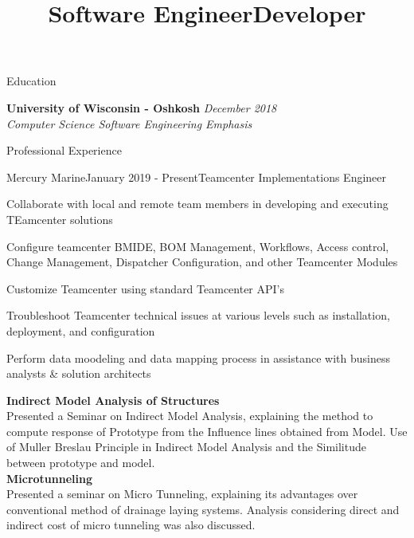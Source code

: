 \documentclass{resume} %
\title{Software Engineer} %
\title{Developer} %
\begin{document}

\begin{rSection}{Education}

{\bf University of Wisconsin - Oshkosh} \hfill {\em December 2018} \\
{\em Computer Science \seperator Software Engineering Emphasis} 

\end{rSection}

\begin{rSection}{Professional Experience}

\begin{rSubsection}{Mercury Marine}{January 2019 - Present}{Teamcenter Implementations Engineer}{}
    \item Collaborate with local and remote team members in developing and executing TEamcenter solutions
    \item Configure teamcenter BMIDE, BOM Management, Workflows, Access control, Change Management, Dispatcher Configuration, and other Teamcenter Modules
    \item Customize Teamcenter using standard Teamcenter API's
    \item Troubleshoot Teamcenter technical issues at various levels such as installation, deployment, and configuration
    \item Perform data moodeling and data mapping process in assistance with business analysts \& solution architects
\end{rSubsection}

{\bf Indirect Model Analysis of Structures}\\
Presented a Seminar on Indirect Model Analysis, explaining the method to compute response of Prototype from the Influence lines obtained from Model. Use of Muller Breslau Principle in Indirect Model Analysis and the Similitude between prototype and  model.\\

{\bf Microtunneling}\\
Presented a seminar on Micro Tunneling, explaining its advantages over conventional method of drainage laying systems. Analysis considering direct and indirect cost of micro tunneling was also discussed.

\end{rSection}
\end{document}
